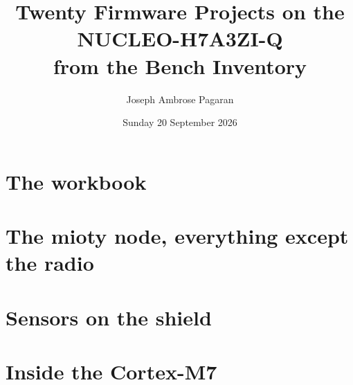 \documentclass[11pt,a4paper]{article}
\title{\sffamily\bfseries Twenty Firmware Projects on the NUCLEO-H7A3ZI-Q\\[2pt]\large from the Bench Inventory}
\author{Joseph Ambrose Pagaran}
\date{Sunday 20 September 2026}
\begin{document}
\maketitle
\thispagestyle{empty}

\clearpage
\tableofcontents
\clearpage

\part{The workbook}

\part{The mioty node, everything except the radio}

\part{Sensors on the shield}

\part{Inside the Cortex-M7}

\appendix
\clearpage

\end{document}
